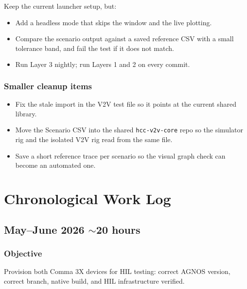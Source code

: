 \documentclass[12pt]{article}
\begin{document}
Keep the current launcher setup, but:

\begin{itemize}
  \item Add a headless mode that skips the window and the live plotting.
  \item Compare the scenario output against a saved reference CSV with a small tolerance band, and fail the test if it does not match.
  \item Run Layer 3 nightly; run Layers 1 and 2 on every commit.
\end{itemize}

\subsubsection*{Smaller cleanup items}

\begin{itemize}
  \item Fix the stale import in the V2V test file so it points at the current shared library.
  \item Move the Scenario CSV into the shared \texttt{hcc-v2v-core} repo so the simulator rig and the isolated V2V rig read from the same file.
  \item Save a short reference trace per scenario so the visual graph check can become an automated one.
\end{itemize}

\section{Chronological Work Log}

\subsection{May--June 2026 \hfill \normalfont\small $\sim$20 hours}

\subsubsection{Objective}
Provision both Comma 3X devices for HIL testing: correct AGNOS version, correct branch, native build, and HIL infrastructure verified.
\end{document}
